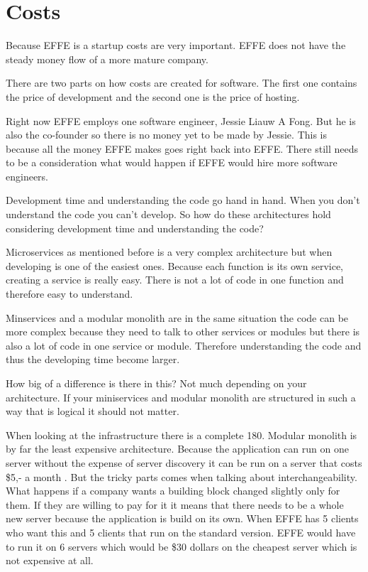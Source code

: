 \section{Costs}
\label{sec:Costs}

Because EFFE is a startup costs are very important. EFFE does not have the steady money flow of a more mature company.

There are two parts on how costs are created for software. The first one contains the price of development and the second one is the price of hosting.

Right now EFFE employs one software engineer, Jessie Liauw A Fong. But he is also the co-founder so there is no money yet to be made by Jessie. This is because all the money EFFE makes goes right back into EFFE. There still needs to be a consideration what would happen if EFFE would hire more software engineers.

Development time and understanding the code go hand in hand. When you don’t understand the code you can’t develop. So how do these architectures hold considering development time and understanding the code?

Microservices as mentioned before is a very complex architecture but when developing is one of the easiest ones. Because each function is its own service, creating a service is really easy. There is not a lot of code in one function and therefore easy to understand.

Minservices and a modular monolith are in the same situation the code can be more complex because they need to talk to other services or modules but there is also a lot of code in one service or module. Therefore understanding the code and thus the developing time become larger.

How big of a difference is there in this? Not much depending on your architecture. If your miniservices and modular monolith are structured in such a way that is logical it should not matter.

When looking at the infrastructure there is a complete 180. Modular monolith is by far the least expensive architecture. Because the application can run on one server without the expense of server discovery it can be run on a server that costs \$5,- a month \cite{digitalOcean}. But the tricky parts comes when talking about interchangeability. What happens if a company wants a building block changed slightly only for them. If they are willing to pay for it it means that there needs to be a whole new server because the application is build on its own. When EFFE has 5 clients who want this and 5 clients that run on the standard version. EFFE would have to run it on 6 servers which would be \$30 dollars on the cheapest server which is not expensive at all.

